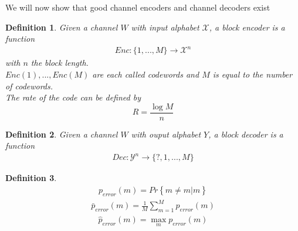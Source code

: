 \documentclass{article}
\newtheorem{definition}{Definition}[section]
\theoremstyle{definition} %
\renewcommand{\Pr}[1]{Pr\left\{#1\right\}}
\def\X{\mathcal{X}}
\def\Y{\mathcal{Y}}
\begin{document}
We will now show that good channel encoders and channel decoders exist

\begin{definition}
  Given a channel $W$ with input alphabet $\X$, a block encoder is a function
  \begin{align*}
    Enc: \{1, ..., M\} \rightarrow \X^n
  \end{align*}
  with $n$ the block length.\\
  $Enc(1), ..., Enc(M)$ are each called codewords and $M$ is equal to the number of codewords.\\
  The rate of the code can be defined by 
  $$ R = \frac{\log M}{n} $$
\end{definition}
\begin{definition}
  Given a channel $W$ with ouput alphabet $Y$, a block decoder is a function
  \begin{align*}
    Dec: \Y^n \rightarrow \{ ?, 1, ..., M\}
  \end{align*}
\end{definition}

\begin{definition}
  \begin{align*}
    p_{error}(m) = \Pr{\hat{m} \neq m | m}
  \end{align*}
  \begin{align*}
    \bar{p}_{error}(m) = \frac{1}{M} \sum_{m=1}^M p_{error}(m)
  \end{align*}
  \begin{align*}
    \hat{p}_{error}(m) = \max_{m} p_{error}(m)
  \end{align*}
\end{definition}






















\end{document}
